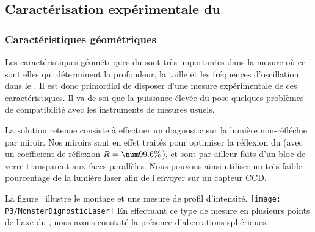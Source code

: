 

\subsection{Caractérisation expérimentale du \pd}
\subsubsection{Caractéristiques géométriques}
Les caractéristiques géométriques du \fl sont très importantes dans la mesure où ce sont elles qui déterminent la profondeur, la taille et les fréquences d'oscillation dans le \pd. Il est donc primordial de disposer d'une mesure expérimentale de ces caractéristiques. Il va de soi que la puissance élevée du \lyb pose quelques problèmes de compatibilité avec les instruments de mesures usuels.

La solution retenue consiste à effectuer un diagnostic sur la lumière non-réfléchie par miroir. Nos miroirs sont en effet traités pour optimiser la réflexion du \ldp (avec un coefficient de réflexion $R=\val{99.6}\%$), et sont par ailleur faits d'un bloc de verre transparent aux faces parallèles. Nous pouvons ainsi utiliser un très faible pourcentage de la lumière laser afin de l'envoyer sur un capteur CCD. 

\casse

\noindent
La figure~ illustre le montage et une mesure de profil d'intensité.
\bfighs
\texttt{[image: P3/MonsterDignosticLaser]}
\label{fig:DignosticLaser}
\efigh
En effectuant ce type de mesure en plusieurs points de l'axe du \fl, nous avons constaté la présence d'aberrations sphériques. 

